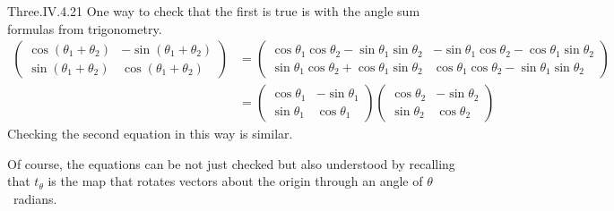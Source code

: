 \begin{ans}{Three.IV.4.21}
      One way to check that the first is true is with
      the angle sum formulas from trigonometry.
      \begin{align*}
        \begin{pmatrix}
          \cos(\theta_1+\theta_2) &-\sin(\theta_1+\theta_2)  \\
          \sin(\theta_1+\theta_2) &\cos(\theta_1+\theta_2)
        \end{pmatrix}
        &=\begin{pmatrix}
          \cos\theta_1\cos\theta_2-\sin\theta_1\sin\theta_2
            &-\sin\theta_1\cos\theta_2-\cos\theta_1\sin\theta_2  \\
          \sin\theta_1\cos\theta_2+\cos\theta_1\sin\theta_2
            &\cos\theta_1\cos\theta_2-\sin\theta_1\sin\theta_2
        \end{pmatrix}                                                    \\
        &=\begin{pmatrix}
          \cos\theta_1 &-\sin\theta_1  \\
          \sin\theta_1 &\cos\theta_1
        \end{pmatrix}
        \begin{pmatrix}
          \cos\theta_2 &-\sin\theta_2  \\
          \sin\theta_2 &\cos\theta_2
        \end{pmatrix}
      \end{align*}
      Checking the second equation in this way is similar.

      Of course, the equations can be not just checked but also understood
      by recalling that $t_\theta$ is the map that rotates
      vectors about the origin through an angle of \( \theta \)~radians.
    
\end{ans}
